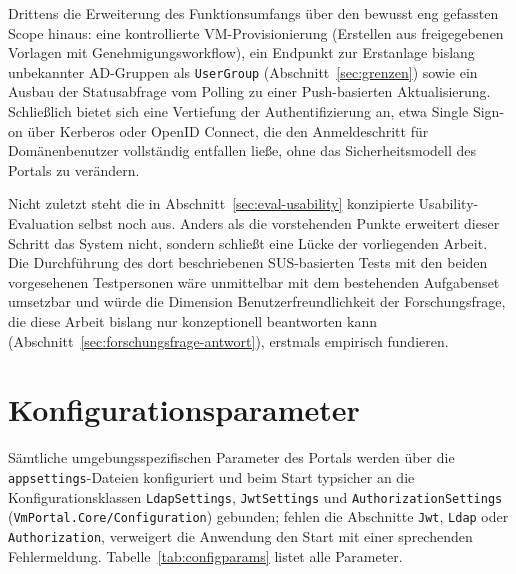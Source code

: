 \documentclass[12pt,a4paper]{article}
\begin{document}
Drittens die Erweiterung des Funktionsumfangs über den bewusst eng gefassten Scope hinaus: eine kontrollierte VM-Provisionierung (Erstellen aus freigegebenen Vorlagen mit Genehmigungsworkflow), ein Endpunkt zur Erstanlage bislang unbekannter AD-Gruppen als \texttt{UserGroup} (Abschnitt~\ref{sec:grenzen}) sowie ein Ausbau der Statusabfrage vom Polling zu einer Push-basierten Aktualisierung. Schließlich bietet sich eine Vertiefung der Authentifizierung an, etwa Single Sign-on über Kerberos oder OpenID Connect, die den Anmeldeschritt für Domänenbenutzer vollständig entfallen ließe, ohne das Sicherheitsmodell des Portals zu verändern.

Nicht zuletzt steht die in Abschnitt~\ref{sec:eval-usability} konzipierte Usability-Evaluation selbst noch aus. Anders als die vorstehenden Punkte erweitert dieser Schritt das System nicht, sondern schließt eine Lücke der vorliegenden Arbeit. Die Durchführung des dort beschriebenen SUS-basierten Tests mit den beiden vorgesehenen Testpersonen wäre unmittelbar mit dem bestehenden Aufgabenset umsetzbar und würde die Dimension Benutzerfreundlichkeit der Forschungsfrage, die diese Arbeit bislang nur konzeptionell beantworten kann (Abschnitt~\ref{sec:forschungsfrage-antwort}), erstmals empirisch fundieren.

\appendix
\clearpage
{}

\section{Konfigurationsparameter}
\label{app:config}

Sämtliche umgebungsspezifischen Parameter des Portals werden über die \texttt{appsettings}-Dateien konfiguriert und beim Start typsicher an die Konfigurationsklassen \texttt{LdapSettings}, \texttt{JwtSettings} und \texttt{AuthorizationSettings} (\texttt{VmPortal.Core/Configuration}) gebunden; fehlen die Abschnitte \texttt{Jwt}, \texttt{Ldap} oder \texttt{Authorization}, verweigert die Anwendung den Start mit einer sprechenden Fehlermeldung. Tabelle~\ref{tab:configparams} listet alle Parameter.
\end{document}
